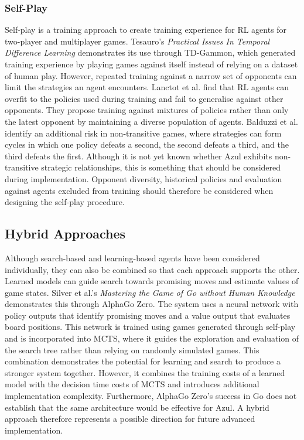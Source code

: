 \subsubsection{Self-Play}
Self-play is a training approach to create training experience for RL agents for two-player and multiplayer  games. Tesauro's \emph{Practical Issues In Temporal Difference Learning} \cite{selfplay} demonstrates its use through TD-Gammon, which generated training experience by playing games against itself instead of relying on a dataset of human play. However, repeated training against a narrow set of opponents can limit the strategies an agent encounters. Lanctot et al. \cite{selfplaydiversity} find that RL agents can overfit to the policies used during training and fail to generalise against other opponents. They propose training against mixtures of policies rather than only the latest opponent by maintaining a diverse population of agents. Balduzzi et al. \cite{selfplaycycle} identify an additional risk in non-transitive games, where strategies can form cycles in which one policy defeats a second, the second defeats a third, and the third defeats the first. Although it is not yet known whether Azul exhibits non-transitive strategic relationships, this is something that should be considered during implementation. Opponent diversity, historical policies and evaluation against agents excluded from training should therefore be considered when designing the self-play procedure.


\subsection{Hybrid Approaches}
Although search-based and learning-based agents have been considered individually, they can also be combined so that each approach supports the other. Learned models can guide search towards promising moves and estimate values of game states. Silver et al.'s \emph{Mastering the Game of Go without Human Knowledge} \cite{alphagozero} demonstrates this through AlphaGo Zero. The system uses a neural network with policy outputs that identify promising moves and a value output that evaluates board positions. This network is trained using games generated through self-play and is incorporated into MCTS, where it guides the exploration and evaluation of the search tree rather than relying on randomly simulated games. This combination demonstrates the potential for learning and search to produce a stronger system together. However, it combines the training costs of a learned model with the decision time costs of MCTS and introduces additional implementation complexity. Furthermore, AlphaGo Zero's success in Go does not establish that the same architecture would be effective for Azul. A hybrid approach therefore represents a possible direction for future advanced implementation.


